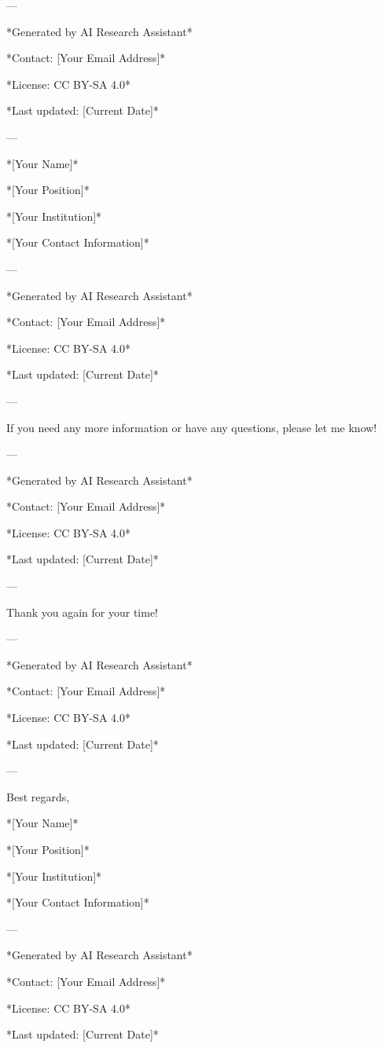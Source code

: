 --- 

*Generated by AI Research Assistant* 

*Contact: [Your Email Address]* 

*License: CC BY-SA 4.0* 

*Last updated: [Current Date]* 

--- 

*[Your Name]* 

*[Your Position]* 

*[Your Institution]* 

*[Your Contact Information]* 

--- 

*Generated by AI Research Assistant* 

*Contact: [Your Email Address]* 

*License: CC BY-SA 4.0* 

*Last updated: [Current Date]* 

--- 

If you need any more information or have any questions, please let me know! 

--- 

*Generated by AI Research Assistant* 

*Contact: [Your Email Address]* 

*License: CC BY-SA 4.0* 

*Last updated: [Current Date]* 

--- 

Thank you again for your time! 

--- 

*Generated by AI Research Assistant* 

*Contact: [Your Email Address]* 

*License: CC BY-SA 4.0* 

*Last updated: [Current Date]* 

--- 

Best regards, 

*[Your Name]* 

*[Your Position]* 

*[Your Institution]* 

*[Your Contact Information]* 

--- 

*Generated by AI Research Assistant* 

*Contact: [Your Email Address]* 

*License: CC BY-SA 4.0* 

*Last updated: [Current Date]* 


